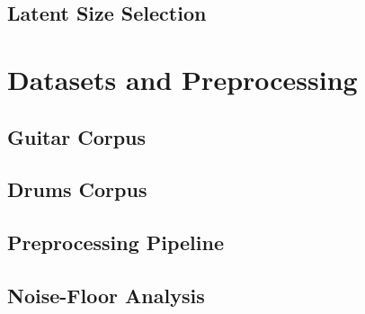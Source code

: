 \subsection{Latent Size Selection}

\section{Datasets and Preprocessing}
\label{sec:method_data}

\subsection{Guitar Corpus}

\subsection{Drums Corpus}

\subsection{Preprocessing Pipeline}

\subsection{Noise-Floor Analysis}
\label{sec:noise_floor}

